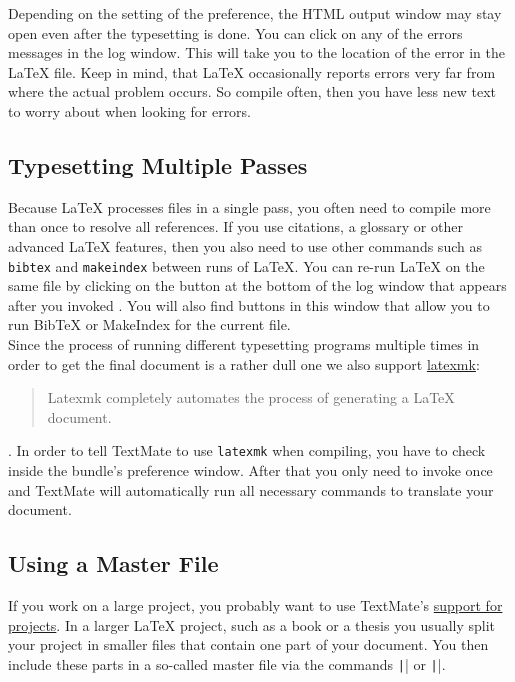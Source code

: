 \documentclass[11pt, x11names]{article}
\begin{document}
Depending on the setting of the  preference, the HTML output window may stay open even after the typesetting is done. You can click on any of the errors messages in the log window. This will take you to the location of the error in the LaTeX file. Keep in mind, that LaTeX occasionally reports errors very far from where the actual problem occurs. So compile often, then you have less new text to worry about when looking for errors.

\subsection{Typesetting Multiple
Passes}

Because LaTeX processes files in a single pass, you often need to compile more than once to resolve all references. If you use citations, a glossary or other advanced LaTeX features, then you also need to use other commands such as \texttt{bibtex} and \texttt{makeindex} between runs of LaTeX. You can re-run LaTeX on the same file by clicking on the  button at the bottom of the log window that appears after you invoked . You will also find buttons in this window that allow you to run BibTeX or MakeIndex for the current file.\\

Since the process of running different typesetting programs multiple times in order to get the final document is a rather dull one we also support \href{http://ctan.org/pkg/latexmk}{latexmk}:

\begin{quote}
  Latexmk completely automates the process of generating a LaTeX document.
\end{quote}

. In order to tell TextMate to use \texttt{latexmk} when compiling, you have to check  inside the bundle's preference window. After that you only need to invoke  once and TextMate will automatically run all necessary commands to translate your document.

\subsection{Using a Master File}

If you work on a large project, you probably want to use TextMate's \href{http://manual.textmate.org/projects}{support for projects}. In a larger LaTeX project, such as a book or a thesis you usually split your project in smaller files that contain one part of your document. You then include these parts in a so-called master file via the commands \texttt|| or \texttt||.\\
\end{document}
